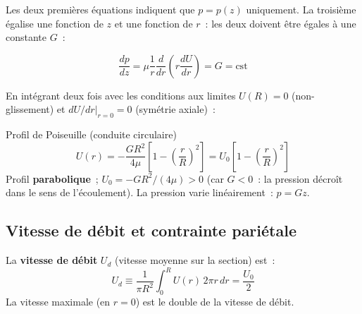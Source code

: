 \documentclass[11pt,a4paper]{report}
\begin{document}
Les deux premières équations indiquent que $p = p(z)$ uniquement. La troisième
égalise une fonction de $z$ et une fonction de $r$~: les deux doivent être
égales à une constante $G$~:

\[
    \frac{dp}{dz} = \mu\frac{1}{r}\frac{d}{dr}\!\left(r\frac{dU}{dr}\right) = G = \text{cst}
\]

En intégrant deux fois avec les conditions aux limites $U(R)=0$ (non-glissement)
et $dU/dr|_{r=0}=0$ (symétrie axiale)~:

\begin{importantbox}{Profil de Poiseuille (conduite circulaire)}
\[
    U(r) = -\frac{GR^2}{4\mu}\left[1-\left(\frac{r}{R}\right)^2\right]
    = U_0\left[1-\left(\frac{r}{R}\right)^2\right]
\]
Profil \textbf{parabolique}~; $U_0=-GR^2/(4\mu) > 0$ (car $G<0$~: la pression
décroît dans le sens de l'écoulement).
La pression varie linéairement~: $p = Gz$.
\end{importantbox}

\begin{center}
\end{center}

\subsection{Vitesse de débit et contrainte pariétale}

La \textbf{vitesse de débit} $U_d$ (vitesse moyenne sur la section) est~:
\[
    U_d \equiv \frac{1}{\pi R^2}\int_0^R U(r)\,2\pi r\,dr = \frac{U_0}{2}
\]
La vitesse maximale (en $r=0$) est le double de la vitesse de débit.
\end{document}

